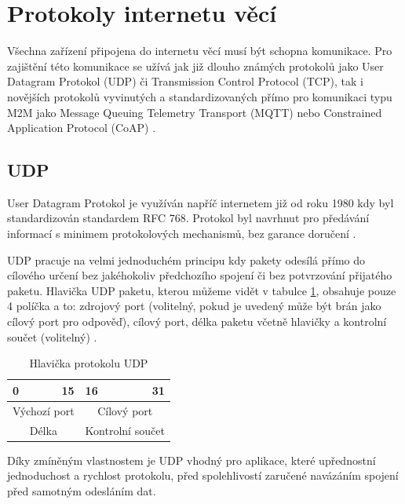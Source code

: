 \section{Protokoly internetu věcí}
\par Všechna zařízení připojena do internetu věcí musí být schopna komunikace. Pro zajištění této komunikace se užívá jak již dlouho známých protokolů jako User Datagram Protokol (UDP) či Transmission Control Protocol (TCP), tak i novějších protokolů vyvinutých a standardizovaných přímo pro komunikaci typu M2M jako Message Queuing Telemetry Transport (MQTT) nebo Constrained Application Protocol (CoAP) \cite{Stusek2019}. 

\subsection{UDP}
\par User Datagram Protokol je využíván napříč internetem již od roku 1980 kdy byl standardizován standardem RFC 768. Protokol byl navrhnut pro předávání informací s minimem protokolových mechanismů, bez garance doručení \cite{Postel28081980}. 
\par UDP pracuje na velmi jednoduchém principu kdy pakety odesílá přímo do cílového určení bez jakéhokoliv předchozího spojení či bez potvrzování přijatého paketu. Hlavička UDP paketu, kterou můžeme vidět v tabulce \ref{table:UDP}, obsahuje pouze 4 políčka a to: zdrojový port (volitelný, pokud je uvedený může být brán jako cílový port pro odpověď), cílový port, délka paketu včetně hlavičky a kontrolní součet (volitelný) \cite{Postel28081980, zVyEOHBjIGxfOA4f}.
    \begin{table}[!h]
    \caption[UDP hlavička]{Hlavička protokolu UDP}
    \label{table:UDP}
    \begin{center}
    \begin{tabular}{|cr|cr|}
    \hline
    \multicolumn{1}{|l}{0} & 15 & \multicolumn{1}{l}{16} & 31 \\
    \hline
    \multicolumn{2}{|c|}{Výchozí port} & \multicolumn{2}{c|}{Cílový port} \\
    \hline
    \multicolumn{2}{|c|}{Délka} & \multicolumn{2}{c|}{Kontrolní součet} \\
    \hline
    \end{tabular}
    \end{center}
    \end{table}
\par Díky zmíněným vlastnostem je UDP vhodný pro aplikace, které upřednostní jednoduchost a rychlost protokolu, před spolehlivostí zaručené navázáním spojení před samotným odesláním dat.

